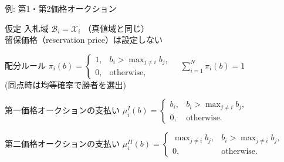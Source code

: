 \documentclass[dvipdfmx,autodetect-engine]{beamer}
\begin{document}
\begin{frame}[t]{例: 第1・第2価格オークション}
  \tiny\setlength{\parskip}{0pt}\setlength{\topsep}{0pt}
  \vspace{-1ex}

  \begin{block}{仮定}
    入札域 $\mathcal B_i=\mathcal X_i$ （真値域と同じ）\\
    留保価格（reservation price）は設定しない
  \end{block}
  \vspace{-1ex}

  \begin{block}{配分ルール}
    $\displaystyle
      \pi_i(b)=
      \begin{cases}
        1, & b_i>\max_{j\neq i}b_j,\\
        0, & \text{otherwise},
      \end{cases}
      \quad \sum_{i=1}^N\pi_i(b)=1$
    \\
    {\scriptsize (同点時は均等確率で勝者を選出)}
  \end{block}
  \vspace{-1ex}

  \begin{block}{第一価格オークションの支払い}
    $\displaystyle
      \mu^I_i(b)=
      \begin{cases}
        b_i, & b_i>\max_{j\neq i}b_j,\\
        0, & \text{otherwise}.
      \end{cases}$
  \end{block}
  \vspace{-1ex}

  \begin{block}{第二価格オークションの支払い}
    $\displaystyle
      \mu^{II}_i(b)=
      \begin{cases}
        \max_{j\neq i}b_j, & b_i>\max_{j\neq i}b_j,\\
        0, & \text{otherwise}.
      \end{cases}$
  \end{block}
\end{frame}
\end{document}
